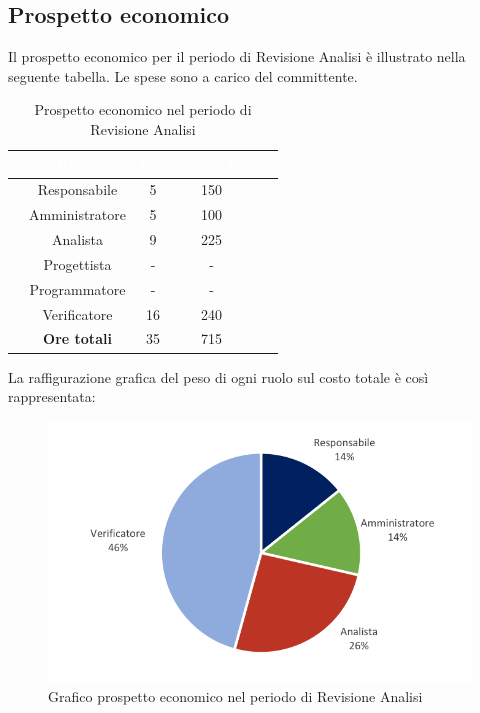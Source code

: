 \subsection{Prospetto economico}
Il prospetto economico per il periodo di Revisione Analisi è illustrato nella seguente tabella.
Le spese sono a carico del committente.
\begin{table}[ht]
	\begin{center}
		\begin{tabular}{cccccc}
			\rowcolor{coolblack}
			\hline
			&\textcolor{white}{Ruolo}&	\textcolor{white}{Ore} &\textcolor{white}{Costo(\euro)} \\
			\hline
			&Responsabile           &5&150  \\
			&Amministratore        & 5& 100 \\
			&Analista                   & 9& 225 \\
			&Progettista              &  -& - \\
			&Programmatore       & - & -  \\
			&Verificatore             & 16 & 240 \\
			\hline
			&\textbf{Ore totali}    &35& 715\\
		\end{tabular}
		\caption{Prospetto economico nel periodo di Revisione Analisi }
	\end{center}
\end{table}

La raffigurazione grafica del peso di ogni ruolo sul costo totale è così rappresentata: 
\begin{figure}[!ht]
	\begin{center}
		\includegraphics{images/grafoProspettoEconomicoDett.png}
		\caption{Grafico prospetto economico nel periodo di Revisione Analisi}
	\end{center}
\end{figure}


